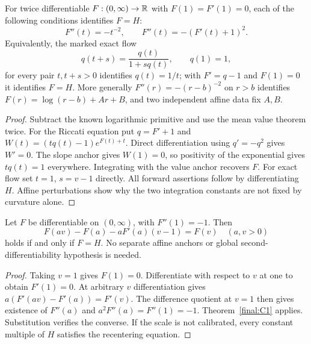 \begin{theorem}
\label{final:C1}
For twice differentiable $F:(0,\infty)\to\mathbb R$ with
$F(1)=F'(1)=0$, each of the following conditions identifies $F=H$:
\[
 F''(t)=-t^{-2},\qquad
 F''(t)=-(F'(t)+1)^2.
\]
Equivalently, the marked exact flow
\[
 q(t+s)=\frac{q(t)}{1+s q(t)},\qquad q(1)=1,
\]
for every pair $t,t+s>0$ identifies $q(t)=1/t$; with
$F'=q-1$ and $F(1)=0$ it identifies $F=H$.
More generally $F''(r)=-(r-b)^{-2}$ on $r>b$ identifies
$F(r)=\log(r-b)+Ar+B$, and two independent affine data fix $A,B$.
\end{theorem}
\begin{proof}
Subtract the known logarithmic primitive and use the mean value
theorem twice. For the Riccati equation put $q=F'+1$ and
$W(t)=(tq(t)-1)e^{F(t)+t}$. Direct differentiation using
$q'=-q^2$ gives $W'=0$. The slope anchor gives $W(1)=0$,
so positivity of the exponential gives $tq(t)=1$ everywhere.
Integrating with the value anchor recovers $F$.
For exact flow set $t=1$, $s=v-1$ directly.
All forward assertions follow by differentiating $H$.
Affine perturbations show why the two integration constants are not
fixed by curvature alone.
\end{proof}

\begin{theorem}
\label{final:C2}
Let $F$ be differentiable on $(0,\infty)$, with $F''(1)=-1$.
Then
\[
 F(av)-F(a)-aF'(a)(v-1)=F(v)\quad(a,v>0)
\]
holds if and only if $F=H$. No separate affine anchors or global
second-differentiability hypothesis is needed.
\end{theorem}
\begin{proof}
Taking $v=1$ gives $F(1)=0$. Differentiate with respect to $v$ at
one to obtain $F'(1)=0$. At arbitrary $v$ differentiation gives
$a(F'(av)-F'(a))=F'(v)$. The difference quotient at $v=1$ then
gives existence of $F''(a)$ and $a^2F''(a)=F''(1)=-1$.
Theorem~\ref{final:C1} applies. Substitution verifies the converse.
If the scale is not calibrated, every constant multiple of $H$
satisfies the recentering equation.
\end{proof}

